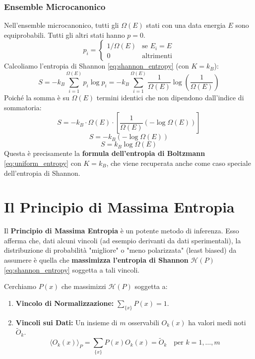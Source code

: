 \begin{enumerate}
\subsubsection{Ensemble Microcanonico}
Nell'ensemble microcanonico, tutti gli $\Omega(E)$ stati con una data energia $E$ sono equiprobabili. Tutti gli altri stati hanno $p=0$.
$$ p_i = \begin{cases} 1/\Omega(E) & \text{se } E_i = E \\ 0 & \text{altrimenti} \end{cases} $$
Calcoliamo l'entropia di Shannon \eqref{eq:shannon_entropy} (con $K=k_B$):
$$ S = -k_B \sum_{i=1}^{\Omega(E)} p_i \log p_i = -k_B \sum_{i=1}^{\Omega(E)} \frac{1}{\Omega(E)} \log \left( \frac{1}{\Omega(E)} \right) $$
Poiché la somma è su $\Omega(E)$ termini identici che non dipendono dall'indice di sommatoria:
$$ S = -k_B \cdot \Omega(E) \cdot \left[ \frac{1}{\Omega(E)} \left( -\log \Omega(E) \right) \right] $$
$$ S = -k_B \left( -\log \Omega(E) \right) $$
\begin{equation}
    S = k_B \log \Omega(E)
    \label{eq:boltzmann_entropy}
\end{equation}
Questa è precisamente la \textbf{formula dell'entropia di Boltzmann} \eqref{eq:uniform_entropy} con $K=k_B$, che viene recuperata anche come caso speciale dell'entropia di Shannon.


\section{Il Principio di Massima Entropia}

Il \textbf{Principio di Massima Entropia} è un potente metodo di inferenza. Esso afferma che, dati alcuni vincoli (ad esempio derivanti da dati sperimentali), la distribuzione di probabilità "migliore" o "meno polarizzata" (least biased) da assumere è quella che \textbf{massimizza l'entropia di Shannon} $\mathcal{H}(P)$ \eqref{eq:shannon_entropy} soggetta a tali vincoli.

\noindent Cerchiamo $P(x)$ che massimizzi $\mathcal{H}(P)$ soggetta a:
\begin{enumerate}
    \item \textbf{Vincolo di Normalizzazione:} $\sum_{\{x\}} P(x) = 1$.
    \item \textbf{Vincoli sui Dati:} Un insieme di $m$ osservabili $O_k(x)$ ha valori medi noti $\tilde{O}_k$.
    \begin{equation}
        \langle O_k(x) \rangle_P = \sum_{\{x\}} P(x) O_k(x) = \tilde{O}_k \quad \text{per } k=1, \dots, m
        \label{eq:mep_constraints}
    \end{equation}
\end{enumerate}


\end{enumerate}
